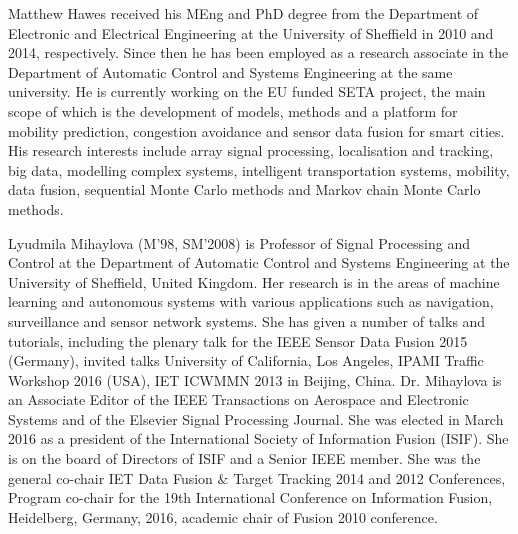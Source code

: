 \documentclass[10pt,final]{IEEEtran}
\begin{document}
\newpage
\begin{IEEEbiography}
 {Matthew Hawes} received his MEng and
PhD degree from the Department of Electronic and Electrical
Engineering at the University of Sheffield in 2010 and 2014,
respectively.  Since then he has been employed as a research
associate in the Department of Automatic Control and Systems
Engineering at the same university.  He is currently working on the
EU funded SETA project, the main scope of which is the development of
models, methods and a platform for mobility prediction, congestion
avoidance and sensor data fusion for smart cities. His research
interests include array signal processing, localisation and
tracking, big data, modelling complex systems, intelligent
transportation systems, mobility, data fusion, sequential Monte
Carlo methods and Markov chain Monte Carlo methods.
\end{IEEEbiography}
\vspace*{-3cm}
\begin{IEEEbiography}
 {Lyudmila Mihaylova} (M'98,
SM'2008) is Professor of Signal Processing and Control at the
Department of Automatic Control and Systems Engineering at the
University of Sheffield, United Kingdom. Her research is in the
areas of machine learning and autonomous systems with various
applications such as navigation, surveillance and sensor network
systems. She has given a number of talks and tutorials, including
the plenary talk for the IEEE Sensor Data Fusion 2015 (Germany),
invited talks University of California, Los Angeles, IPAMI Traffic
Workshop 2016 (USA), IET ICWMMN 2013 in Beijing, China. Dr.
Mihaylova is an Associate Editor of the IEEE Transactions on
Aerospace and Electronic Systems and of the Elsevier Signal
Processing Journal. She was elected in March 2016 as a president of
the International Society of Information Fusion (ISIF). She is on
the board of Directors of ISIF and a Senior IEEE member. She was the
general co-chair IET Data Fusion $\&$ Target Tracking 2014 and 2012
Conferences, Program co-chair for the 19th International Conference
on Information Fusion, Heidelberg, Germany, 2016, academic chair of
Fusion 2010 conference.
\end{IEEEbiography}
\vspace{-3cm}
\end{document}
